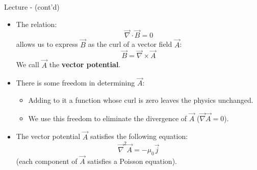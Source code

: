 \begin{frame}{Lecture \summarizedlecture - \lecturesummarytitle (cont'd)}

\begin{itemize}

\item
      The relation:
      \begin{equation*}
              \vec{\nabla} \cdot \vec{B} = 0
      \end{equation*}
      allows us to express $\vec{B}$ as the curl of a vector field  $\vec{A}$:
      \begin{equation*}
             \vec{B} = \vec{\nabla} \times \vec{A}
      \end{equation*}
      We call $\vec{A}$ the {\bf vector potential}.

\item
     There is some freedom in determining $\vec{A}$:
    \begin{itemize}
         \item Adding to it a function whose curl is zero leaves the physics unchanged.
         \item We use this freedom to eliminate the divergence of $\vec{A}$ ($\vec{\nabla} \vec{A} = 0$).
    \end{itemize}

\item
     The vector potential $\vec{A}$ satisfies the following equation:
     \begin{equation*}
         \vec{\nabla}^2 \vec{A}   =  - \mu_{0} \vec{j}
     \end{equation*}
     (each component of $\vec{A}$ satisfies a Poisson equation).

\end{itemize}

\end{frame}
